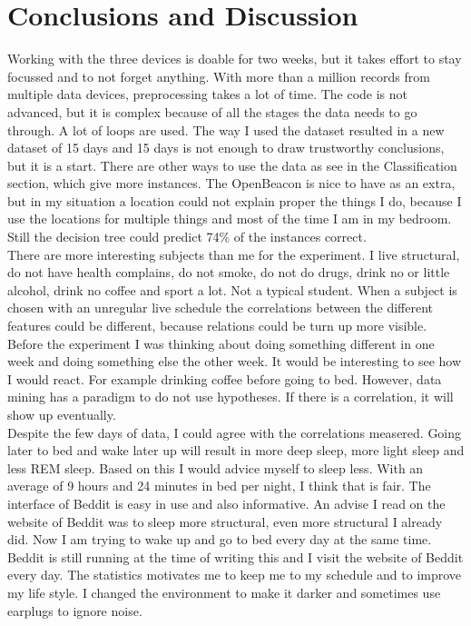 \section{Conclusions and Discussion}
	Working with the three devices is doable for two weeks, but it takes effort to stay focussed and to not forget anything. With more than a million records from multiple data devices, preprocessing takes a lot of time. The code is not advanced, but it is complex because of all the stages the data needs to go through. A lot of loops are used. The way I used the dataset resulted in a new dataset of 15 days and 15 days is not enough to draw trustworthy conclusions, but it is a start. There are other ways to use the data as see in the Classification section, which give more instances. The OpenBeacon is nice to have as an extra, but in my situation a location could not explain proper the things I do, because I use the locations for multiple things and most of the time I am in my bedroom. Still the decision tree could predict 74\% of the instances correct. 
	\\
	There are more interesting subjects than me for the experiment. I live structural, do not have health complains, do not smoke, do not do drugs, drink no or little alcohol, drink no coffee and sport a lot. Not a typical student. When a subject is chosen with an unregular live schedule the correlations between the different features could be different, because relations could be turn up more visible. Before the experiment I was thinking about doing something different in one week and doing something else the other week. It would be interesting to see how I would react. For example drinking coffee before going to bed. However, data mining has a paradigm to do not use hypotheses. If there is a correlation, it will show up eventually.
	\\
	Despite the few days of data, I could agree with the correlations measered. Going later to bed and wake later up will result in more deep sleep, more light sleep and less REM sleep. Based on this I would advice myself to sleep less. With an average of 9 hours and 24 minutes in bed per night, I think that is fair. The interface of Beddit is easy in use and also informative. An advise I read on the website of Beddit was to sleep more structural, even more structural I already did. Now I am trying to wake up and go to bed every day at the same time. Beddit is still running at the time of writing this and I visit the website of Beddit every day. The statistics motivates me to keep me to my schedule and to improve my life style. I changed the environment to make it darker and sometimes use earplugs to ignore noise. 
